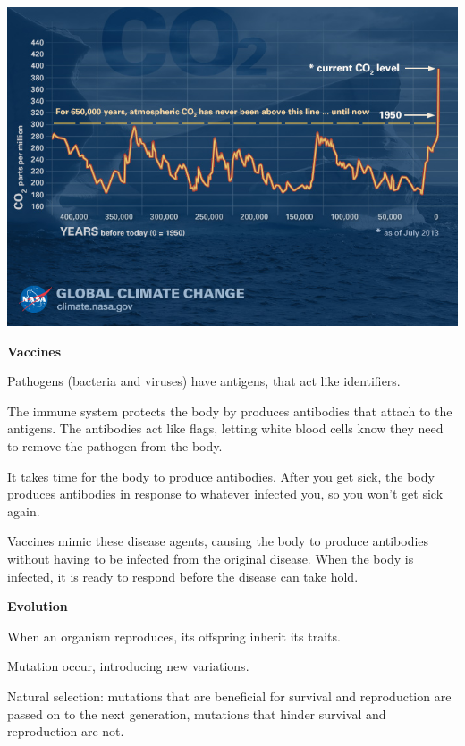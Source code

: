 \documentclass[12pt]{article}
\begin{document}
\includegraphics[width=6in]{../images/43_24_g-co2-l.jpg}

\clearpage
\begin{center}\textbf{\Large Vaccines}\end{center}

Pathogens (bacteria and viruses) have antigens, that act like identifiers.

The immune system protects the body by produces antibodies that attach to the antigens. The antibodies act like flags, letting white blood cells know they need to remove the pathogen from the body.

It takes time for the body to produce antibodies. After you get sick, the body produces antibodies in response to whatever infected you, so you won't get sick again.

Vaccines mimic these disease agents, causing the body to produce antibodies without having to be infected from the original disease. When the body is infected, it is ready to respond before the disease can take hold.

\begin{center}\textbf{\Large Evolution}\end{center}

When an organism reproduces, its offspring inherit its traits.

Mutation occur, introducing new variations.

Natural selection: mutations that are beneficial for survival and reproduction are passed on to the next generation, mutations that hinder survival and reproduction are not.

\clearpage
\end{document}
